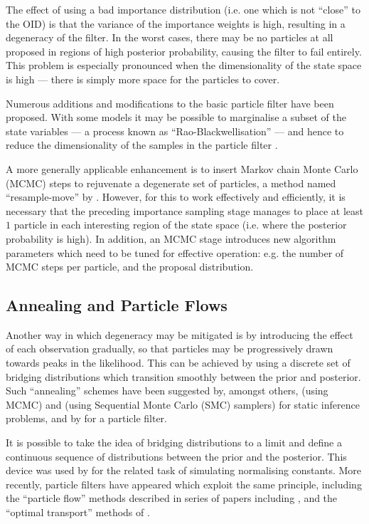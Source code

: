 \documentclass{statsoc}
\begin{document}
The effect of using a bad importance distribution (i.e. one which is not ``close'' to the OID) is that the variance of the importance weights is high, resulting in a degeneracy of the filter. In the worst cases, there may be no particles at all proposed in regions of high posterior probability, causing the filter to fail entirely. This problem is especially pronounced when the dimensionality of the state space is high --- there is simply more space for the particles to cover.

Numerous additions and modifications to the basic particle filter have been proposed. With some models it may be possible to marginalise a subset of the state variables --- a process known as ``Rao-Blackwellisation'' --- and hence to reduce the dimensionality of the samples in the particle filter \citep{Casella1996,Doucet2000}.

A more generally applicable enhancement is to insert Markov chain Monte Carlo (MCMC) steps to rejuvenate a degenerate set of particles, a method named ``resample-move'' by \citet{Gilks2001}. However, for this to work effectively and efficiently, it is necessary that the preceding importance sampling stage manages to place at least $1$ particle in each interesting region of the state space (i.e. where the posterior probability is high). In addition, an MCMC stage introduces new algorithm parameters which need to be tuned for effective operation: e.g. the number of MCMC steps per particle, and the proposal distribution.

\subsection{Annealing and Particle Flows}

Another way in which degeneracy may be mitigated is by introducing the effect of each observation gradually, so that particles may be progressively drawn towards peaks in the likelihood. This can be achieved by using a discrete set of bridging distributions which transition smoothly between the prior and posterior. Such ``annealing'' schemes have been suggested by, amongst others, \citet{Neal2001} (using MCMC) and \citet{DelMoral2006} (using Sequential Monte Carlo (SMC) samplers) for static inference problems, and by \citet{Godsill2001b} for a particle filter.

It is possible to take the idea of bridging distributions to a limit and define a continuous sequence of distributions between the prior and the posterior. This device was used by \citet{Gelman1998} for the related task of simulating normalising constants. More recently, particle filters have appeared which exploit the same principle, including the ``particle flow'' methods described in series of papers including \citep{Daum2008,Daum2011d}, and the ``optimal transport'' methods of \cite{Reich2011,Reich2012a}.
\end{document}
